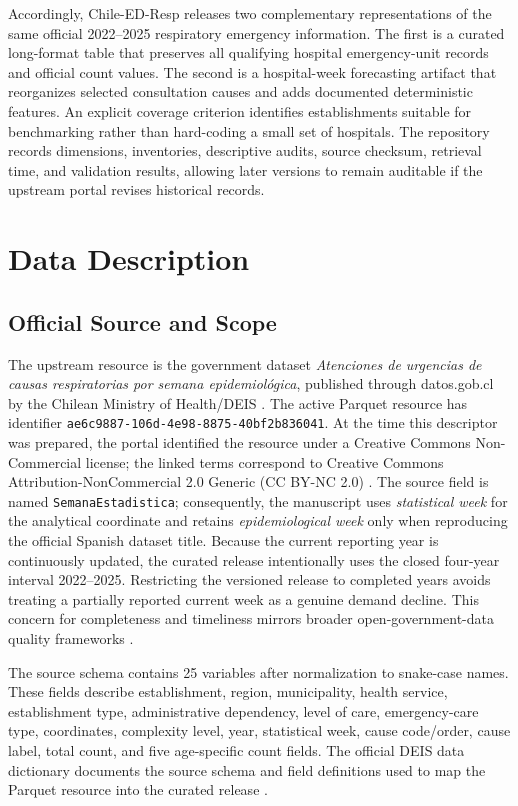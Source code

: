 \documentclass[data,datadescriptor,submit,moreauthors,pdftex]{Definitions/mdpi}
\newcommand{\datasetname}{Chile-ED-Resp}
\newcommand{\sourceid}{ae6c9887-106d-4e98-8875-40bf2b836041}
\begin{document}
Accordingly, \datasetname{} releases two complementary representations of the same official 2022--2025 respiratory emergency information. The first is a curated long-format table that preserves all qualifying hospital emergency-unit records and official count values. The second is a hospital-week forecasting artifact that reorganizes selected consultation causes and adds documented deterministic features. An explicit coverage criterion identifies establishments suitable for benchmarking rather than hard-coding a small set of hospitals. The repository records dimensions, inventories, descriptive audits, source checksum, retrieval time, and validation results, allowing later versions to remain auditable if the upstream portal revises historical records.

\section{Data Description}
\label{sec:data-description}

\subsection{Official Source and Scope}

The upstream resource is the government dataset \textit{Atenciones de urgencias de causas respiratorias por semana epidemiol\'ogica}, published through datos.gob.cl by the Chilean Ministry of Health/DEIS \citep{DEIS2026}. The active Parquet resource has identifier \texttt{\sourceid}. At the time this descriptor was prepared, the portal identified the resource under a Creative Commons Non-Commercial license; the linked terms correspond to Creative Commons Attribution-NonCommercial 2.0 Generic (CC BY-NC 2.0) \citep{DEIS2026,CreativeCommonsBYNC20}. The source field is named \texttt{SemanaEstadistica}; consequently, the manuscript uses \emph{statistical week} for the analytical coordinate and retains \emph{epidemiological week} only when reproducing the official Spanish dataset title. Because the current reporting year is continuously updated, the curated release intentionally uses the closed four-year interval 2022--2025. Restricting the versioned release to completed years avoids treating a partially reported current week as a genuine demand decline. This concern for completeness and timeliness mirrors broader open-government-data quality frameworks \citep{Vetro2016,Bhandari2021}.

The source schema contains 25 variables after normalization to snake-case names. These fields describe establishment, region, municipality, health service, establishment type, administrative dependency, level of care, emergency-care type, coordinates, complexity level, year, statistical week, cause code/order, cause label, total count, and five age-specific count fields. The official DEIS data dictionary documents the source schema and field definitions used to map the Parquet resource into the curated release \citep{DEISDictionary2024}.
\end{document}
